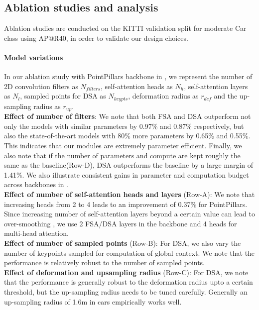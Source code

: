 \documentclass[10pt,twocolumn,letterpaper]{article}
\begin{document}
\subsection{Ablation studies and analysis}
Ablation studies are conducted on the KITTI validation split \cite{MV3D} for moderate Car class using AP@R40, in order to validate our design choices.
\vspace{-0.4cm}
\paragraph{Model variations} In our ablation study with PointPillars backbone in , we represent the number of 2D convolution filters as $N_{filters}$, self-attention heads as $N_h$, self-attention layers as $N_l$, sampled points for DSA as $N_{keypts}$, deformation radius as $r_{def}$ and the up-sampling radius as $r_{up}$. 
\\ \textbf{Effect of number of filters}: We note that both FSA and DSA outperform not only the models with similar parameters by 0.97\% and 0.87\% respectively, but also the state-of-the-art models with 80\% more parameters by 0.65\% and 0.55\%. This indicates that our modules are extremely parameter efficient. Finally, we also note that if the number of parameters and compute are kept roughly the same as the baseline(Row-D), DSA outperforms the baseline by a large margin of 1.41\%. We also illustrate consistent gains in parameter and computation budget across backbones in . 
\\ \textbf{Effect of number of self-attention heads and layers} (Row-A):  We note that increasing heads from 2 to 4 leads to an improvement of 0.37\% for PointPillars. Since increasing number of self-attention layers beyond a certain value can lead to over-smoothing \cite{oversmoothing}, we use 2 FSA/DSA layers in the backbone and 4 heads for multi-head attention. 
\\ \textbf{Effect of number of sampled points} (Row-B): For DSA, we also vary the number of keypoints sampled for computation of global context. We note that the performance is relatively robust to the number of sampled points. 
\\ \textbf{Effect of deformation and upsampling radius} (Row-C): For DSA, we note that the performance is generally robust to the deformation radius upto a certain threshold, but the up-sampling radius needs to be tuned carefully. Generally an up-sampling radius of 1.6m in cars empirically works well. 
\vspace{-0.4cm}
\end{document}
